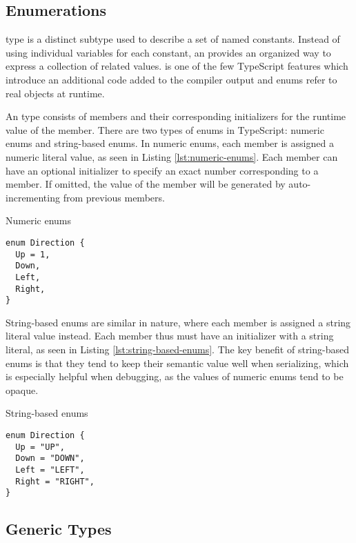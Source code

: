 \subsection{Enumerations}

 type is a distinct subtype used to describe a set of named constants. Instead of using individual variables for each constant, an  provides an organized way to express a collection of related values.  is one of the few TypeScript features which introduce an additional code added to the compiler output and enums refer to real objects at runtime.

An  type consists of members and their corresponding initializers for the runtime value of the member. There are two types of enums in TypeScript: numeric enums and string-based enums. In numeric enums, each member is assigned a numeric literal value, as seen in Listing \ref{lst:numeric-enums}. Each member can have an optional initializer to specify an exact number corresponding to a member. If omitted, the value of the member will be generated by auto-incrementing from previous members.

\begin{listing}[ht]
  \caption{Numeric enums}\label{lst:numeric-enums}
  \begin{verbatim}
enum Direction {
  Up = 1,
  Down,
  Left,
  Right,
}
\end{verbatim}
\end{listing}

String-based enums are similar in nature, where each member is assigned a string literal value instead. Each member thus must have an initializer with a string literal, as seen in Listing \ref{lst:string-based-enums}. The key benefit of string-based enums is that they tend to keep their semantic value well when serializing, which is especially helpful when debugging, as the values of numeric enums tend to be opaque.

\begin{listing}[ht]
  \caption{String-based enums}\label{lst:string-based-enums}
  \begin{verbatim}
enum Direction {
  Up = "UP",
  Down = "DOWN",
  Left = "LEFT",
  Right = "RIGHT",
}
\end{verbatim}
\end{listing}

\subsection{Generic Types}

